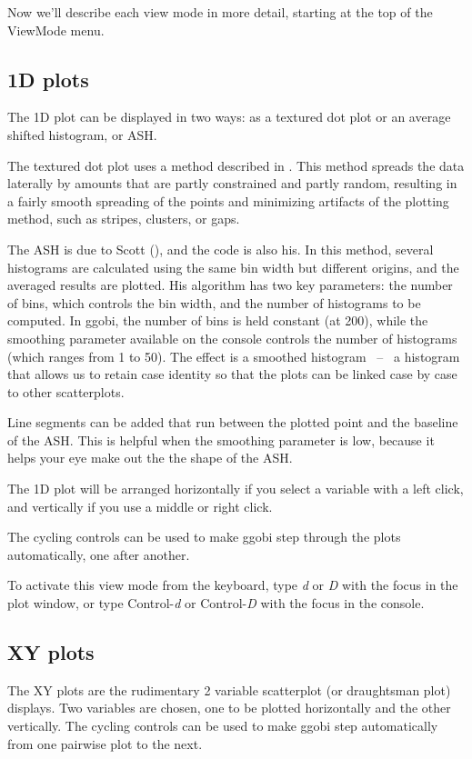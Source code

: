 \documentclass[11pt]{article}
\begin{document}
Now we'll describe each view mode in more detail, starting at the
top of the ViewMode menu. 

\subsection{1D plots}

The 1D plot can be displayed in two ways:  as a textured dot plot
or an average shifted histogram, or ASH.

The textured dot plot uses a method described in \cite{TukeyTukey90}.
This method spreads the data laterally by amounts that are partly
constrained and partly random, resulting in a fairly smooth spreading
of the points and minimizing artifacts of the plotting method, such as
stripes, clusters, or gaps.

The ASH is due to Scott (\cite{Scott92}), and the code is also his.
In this method, several histograms are calculated using the same bin
width but different origins, and the averaged results are plotted.
His algorithm has two key parameters: the number of bins, which controls
the bin width, and the number of histograms to be computed.  In ggobi,
the number of bins is held constant (at 200), while the smoothing
parameter available on the console controls the number of histograms
(which ranges from 1 to 50).  The effect is a smoothed histogram ~--~
a histogram that allows us to retain case identity so that the plots
can be linked case by case to other scatterplots.

Line segments can be added that run between the plotted point and the
baseline of the ASH.  This is helpful when the smoothing parameter is low,
because it helps your eye make out the the shape of the ASH.

The 1D plot will be arranged horizontally if you select a variable
with a left click, and vertically if you use a middle or right click.

The cycling controls can be used to make ggobi step through the
plots automatically, one after another.

To activate this view mode from the keyboard, type {\em d} or {\em D}
with the focus in the plot window, or type Control-{\em d} or
Control-{\em D} with the focus in the console.

\subsection{XY plots}

The XY plots are the rudimentary 2 variable scatterplot (or draughtsman
plot) displays. Two variables are chosen, one to be plotted horizontally
and the other vertically. The cycling controls can be used to make ggobi
step automatically from one pairwise plot to the next.
\end{document}

